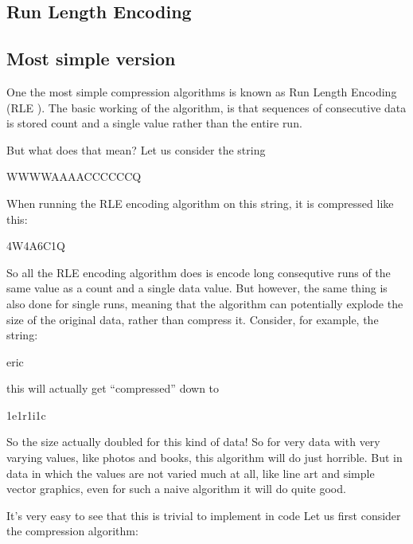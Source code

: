 \begin{refsection}
\section{Run Length Encoding}
\label{sec:rle}

\subsection{Most simple version}
\label{sec:most-simple-version}

One the most simple compression algorithms is known as Run Length
Encoding (RLE
). \cite{nagarajan11:_enhan_approac_run_lengt_encod_schem}
The basic working of the algorithm, is that sequences of consecutive
data is stored count and a single value rather than the entire
run.

But what does that mean? Let us consider the string

\begin{indentpar}
  WWWWAAAACCCCCCQ
\end{indentpar}

When running the RLE encoding algorithm on this string, it is
compressed like this:

\begin{indentpar}
  4W4A6C1Q
\end{indentpar}

So all the RLE encoding algorithm does is encode long consequtive runs
of the same value as a count and a single data value. But however, the
same thing is also done for single runs, meaning that the algorithm
can potentially explode the size of the original data, rather than
compress it. Consider, for example, the string:

\begin{indentpar}
  eric
\end{indentpar}

this will actually get ``compressed'' down to

\begin{indentpar}
  1e1r1i1c
\end{indentpar}

So the size actually doubled for this kind of data! So for very data
with very varying values, like photos and books, this algorithm will
do just horrible. But in data in which the values are not varied much
at all, like line art and simple vector graphics, even for such a
naive algorithm it will do quite good.

It's very easy to see that this is trivial to implement in code Let us
first consider the compression algorithm:


\end{refsection}
